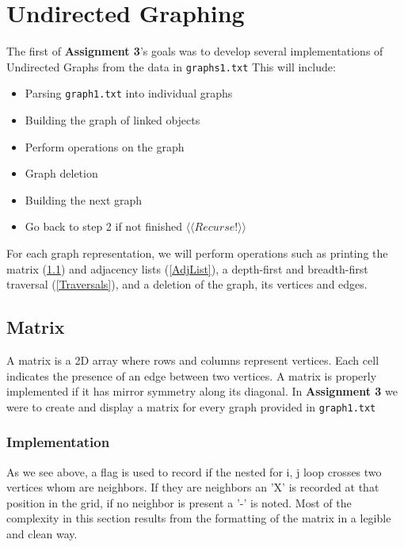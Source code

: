 \documentclass[12pt, letterpaper]{article}
\begin{document}
\section{Undirected Graphing} \label{Graph}
The first of \textbf{Assignment 3}'s goals was to develop several implementations of Undirected Graphs from the data in \texttt{graphs1.txt}
\vspace*{5pt}
\newline
This will include:
\begin{itemize}
   \item Parsing \texttt{graph1.txt} into individual graphs
   \item Building the graph of linked objects
   \item Perform operations on the graph
   \item Graph deletion
   \item Building the next graph
   \item Go back to step 2 if not finished $\langle \langle Recurse! \rangle \rangle$
\end{itemize}
For each graph representation, we will perform operations such as printing the matrix (\ref{Matrix}) and adjacency lists (\ref{AdjList}), a depth-first and breadth-first traversal (\ref{Traversals}), and a deletion of the graph, its vertices and edges.

\subsection{Matrix} \label{Matrix}
A matrix is a 2D array where rows and columns represent vertices.
Each cell indicates the presence of an edge between two vertices.
A matrix is properly implemented if it has mirror symmetry along its diagonal.
In \textbf{Assignment 3} we were to create and display a matrix for every graph provided in \texttt{graph1.txt}
\subsubsection{Implementation}
\begin{center}
   
\end{center}
As we see above, a flag is used to record if the nested for i, j loop crosses two vertices whom are neighbors.
If they are neighbors an 'X' is recorded at that position in the grid, if no neighbor is present a '-' is noted.
Most of the complexity in this section results from the formatting of the matrix in a legible and clean way.
\end{document}

